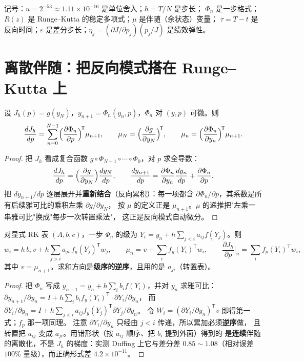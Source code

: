 记号：$u=2^{-53}\approx1.11\times10^{-16}$ 是单位舍入；$h=T/N$ 是步长；
$\Phi_n$ 是一步格式；$R(z)$ 是 Runge--Kutta 的稳定多项式；$\mu$ 是伴随（余状态）变量；
$\tau=T-t$ 是反向时间；$\varepsilon$ 是差分步长；$\eta_j=(\partial J/\partial p_j)(p_j/J)$ 是绩效弹性。

\section{离散伴随：把反向模式搭在 Runge--Kutta 上}

\begin{theorem}[离散伴随递推]\label{thm:discrete-adjoint}
设 $J_h(p)=g(y_N)$，$y_{n+1}=\Phi_n(y_n,p)$，$\Phi_n$ 对 $(y,p)$ 可微。则
\[
\frac{dJ_h}{dp}=\sum_{n=0}^{N-1}\Bigl(\frac{\partial\Phi_n}{\partial p}\Bigr)^{\!\mathsf T}\mu_{n+1},
\qquad
\mu_N=\Bigl(\frac{\partial g}{\partial y_N}\Bigr)^{\!\mathsf T},\qquad
\mu_n=\Bigl(\frac{\partial\Phi_n}{\partial y_n}\Bigr)^{\!\mathsf T}\mu_{n+1}.
\]
\end{theorem}

\begin{proof}
把 $J_h$ 看成复合函数 $g\circ\Phi_{N-1}\circ\cdots\circ\Phi_0$，对 $p$ 求全导数：
\[
\frac{dJ_h}{dp}=\Bigl(\frac{\partial g}{\partial y_N}\Bigr)\frac{dy_N}{dp},
\qquad
\frac{dy_{n+1}}{dp}=\frac{\partial\Phi_n}{\partial y_n}\frac{dy_n}{dp}+\frac{\partial\Phi_n}{\partial p}.
\]
把 $dy_{n+1}/dp$ 逐层展开并\textbf{重新结合}（反向累积）：每一项都含
$\partial\Phi_n/\partial p$，其系数是所有后续雅可比的乘积左乘 $\partial g/\partial y_N$，
按 $\mu$ 的定义正是 $\mu_{n+1}$。$\mu$ 的递推把"左乘一串雅可比"换成"每步一次转置乘法"，
这正是反向模式自动微分。
\end{proof}

\begin{theorem}[显式 RK 的转置表形式]\label{thm:transposed-tableau}
对显式 RK 表 $(A,b,c)$，一步 $\Phi_n$ 的级为 $Y_i=y_n+h\sum_{j<i}a_{ij}f(Y_j)$。则
\[
w_i=h\,b_i\,v+h\sum_{j>i}a_{ji}\,f_y(Y_j)^{\mathsf T}w_j,\qquad
\mu_n=v+\sum_i f_y(Y_i)^{\mathsf T}w_i,\qquad
\frac{\partial J_h}{\partial p}\Big|_n=\sum_i f_p(Y_i)^{\mathsf T}w_i,
\]
其中 $v=\mu_{n+1}$。求和方向是\textbf{级序的逆序}，且用的是 $a_{ji}$（转置表）。
\end{theorem}

\begin{proof}
把 $\Phi_n$ 写成 $y_{n+1}=y_n+h\sum_ib_i f(Y_i)$，并对 $y_n$ 求雅可比：
$\partial y_{n+1}/\partial y_n=I+h\sum_ib_if_y(Y_i)^{\mathsf T}\cdot\partial Y_i/\partial y_n$，
而 $\partial Y_i/\partial y_n=I+h\sum_{j<i}a_{ij}f_y(Y_j)^{\mathsf T}\partial Y_j/\partial y_n$。
令 $W_i=(\partial Y_i/\partial y_n)^{\mathsf T}v$ 即得第一式；$f_p$ 那一项同理。
注意 $\partial Y_i/\partial y_n$ 只经由 $j<i$ 传递，所以累加必须\textbf{逆序}做，
且转置把 $a_{ij}$ 变成 $a_{ji}$。用错形状（按 $a_{ij}$ 顺序、把 $b_i$ 提到外面）得到的
是\textbf{连续}伴随的离散化，不是 $J_h$ 的梯度：实测 Duffing 上它与差分差
$0.85\sim1.08$（相对误差 $100\%$ 量级），而正确形式差 $4.2\times10^{-11}$。
\end{proof}

